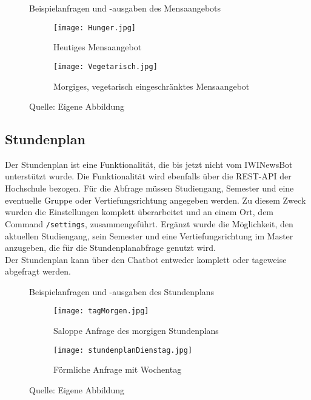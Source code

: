 \begin{figure}[H]
    \centering
    \caption{Beispielanfragen und -ausgaben des Mensaangebots}
    \begin{subfigure}{.5\textwidth}
        \centering
        \caption{Heutiges Mensaangebot}
          \texttt{[image: Hunger.jpg]}
          \label{img:mensa1}
    \end{subfigure}%
    \begin{subfigure}{.5\textwidth}
        \centering
        \caption{Morgiges, vegetarisch eingeschränktes Mensaangebot}
          \texttt{[image: Vegetarisch.jpg]}
          \label{img:mensa2}
    \end{subfigure}
    \caption*{Quelle: Eigene Abbildung}
    \label{fig:mensa}
\end{figure}


\subsection{Stundenplan}
Der Stundenplan ist eine Funktionalität, die bis jetzt nicht vom IWINewsBot unterstützt wurde. Die Funktionalität wird ebenfalls über die REST-API der Hochschule bezogen. Für die Abfrage müssen Studiengang, Semester und eine eventuelle Gruppe oder Vertiefungsrichtung angegeben werden. Zu diesem Zweck wurden die Einstellungen komplett überarbeitet und an einem Ort, dem Command \texttt{/settings}, zusammengeführt. Ergänzt wurde die Möglichkeit, den aktuellen Studiengang, sein Semester und eine Vertiefungsrichtung im Master anzugeben, die für die Stundenplanabfrage genutzt wird. \\
Der Stundenplan kann über den Chatbot entweder komplett oder tageweise abgefragt werden.

\begin{figure}[H]
    \centering
    \caption{Beispielanfragen und -ausgaben des Stundenplans}
    \begin{subfigure}{.5\textwidth}
        \centering
        \caption{Saloppe Anfrage des morgigen Stundenplans}
          \texttt{[image: tagMorgen.jpg]}
          \label{img:stundenplan1}
    \end{subfigure}%
    \begin{subfigure}{.5\textwidth}
        \centering
        \caption{Förmliche Anfrage mit Wochentag}
          \texttt{[image: stundenplanDienstag.jpg]}
          \label{img:stundenplan2}
    \end{subfigure}
    \caption*{Quelle: Eigene Abbildung}
    \label{fig:stundenplan}
\end{figure}

